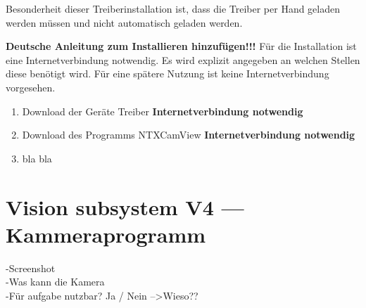 Besonderheit dieser Treiberinstallation ist, dass die Treiber per Hand geladen werden müssen und nicht automatisch geladen werden.

\textbf{Deutsche Anleitung zum Installieren hinzufügen!!!}
Für die Installation ist eine Internetverbindung notwendig. Es wird explizit angegeben an welchen Stellen diese benötigt wird. Für eine spätere Nutzung ist keine Internetverbindung vorgesehen.
\begin{enumerate}
\item Download der Geräte Treiber \textbf{Internetverbindung notwendig}
\item Download des Programms NTXCamView \textbf{Internetverbindung notwendig}
\item bla bla 
\end{enumerate}

\section{Vision subsystem V4 --- Kammeraprogramm}
-Screenshot\\
-Was kann die Kamera\\
-Für aufgabe nutzbar? Ja / Nein -->Wieso??\\

